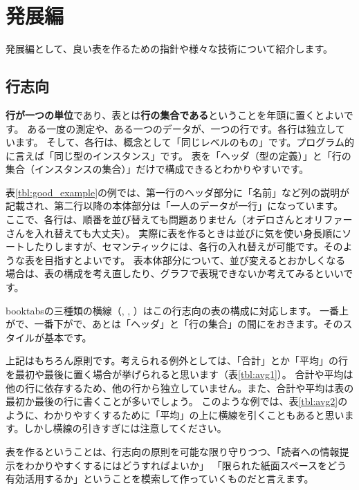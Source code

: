 \documentclass[uplatex,onecolumn,9pt,dvipdfmx]{jsarticle}
\newcommand{\Tref}[1]{表\ref{#1}}
\begin{document}
\section{発展編}
発展編として、良い表を作るための指針や様々な技術について紹介します。

\subsection{行志向}
\textbf{行が一つの単位}であり、表とは\textbf{行の集合である}ということを年頭に置くとよいです。
ある一度の測定や、ある一つのデータが、一つの行です。各行は独立しています。
そして、各行は、概念として「同じレベルのもの」です。プログラム的に言えば「同じ型のインスタンス」です。
表を「ヘッダ（型の定義）」と「行の集合（インスタンスの集合）」だけで構成できるとわかりやすいです。

\Tref{tbl:good_example}の例では、第一行のヘッダ部分に「名前」など列の説明が記載され、第二行以降の本体部分は「一人のデータが一行」になっています。
ここで、各行は、順番を並び替えても問題ありません（オデロさんとオリファーさんを入れ替えても大丈夫）。
実際に表を作るときは並びに気を使い身長順にソートしたりしますが、セマンティックには、各行の入れ替えが可能です。そのような表を目指すとよいです。
表本体部分について、並び変えるとおかしくなる場合は、表の構成を考え直したり、グラフで表現できないか考えてみるといいです。

booktabsの三種類の横線（\texttt{\toprule}, \texttt{\midrule}, \texttt{\bottomrule}）はこの行志向の表の構成に対応します。
一番上が\texttt{\toprule}で、一番下が\texttt{\bottomrule}で、あとは「ヘッダ」と「行の集合」の間に\texttt{\midrule}をおきます。そのスタイルが基本です。

上記はもちろん原則です。考えられる例外としては、「合計」とか「平均」の行を最初や最後に置く場合が挙げられると思います（\Tref{tbl:avg1}）。
合計や平均は他の行に依存するため、他の行から独立していません。また、合計や平均は表の最初か最後の行に書くことが多いでしょう。
このような例では、\Tref{tbl:avg2}のように、わかりやすくするために「平均」の上に横線を引くこともあると思います。しかし横線の引きすぎには注意してください。

表を作るということは、行志向の原則を可能な限り守りつつ、「読者への情報提示をわかりやすくするにはどうすればよいか」
「限られた紙面スペースをどう有効活用するか」ということを模索して作っていくものだと言えます。
\end{document}
